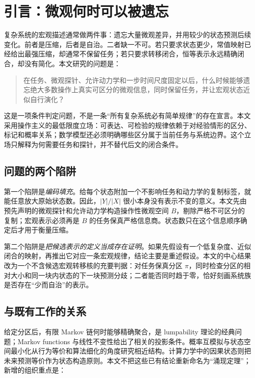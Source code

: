 \section{引言：微观何时可以被遗忘}
\label{sec:introduction}

复杂系统的宏观描述通常做两件事：遗忘大量微观差异，并用较少的状态预测后续变化。前者是压缩，后者是自治。二者缺一不可。若只要求状态更少，常值映射已经给出最强压缩，却通常不保留任务；若只要求转移闭合，恒等表示永远精确闭合，却没有简化。本文研究的问题是：

\begin{quote}
在任务、微观探针、允许动力学和一步时间尺度固定以后，什么时候能够遗忘绝大多数操作上真实可区分的微观信息，同时保留任务，并让宏观状态近似自行演化？
\end{quote}

这是一项条件判定问题，不是一条“所有复杂系统必有简单规律”的存在宣言。本文采用操作主义的最低限度立场：可表达、可检验的规律依赖于对经验情形的区分、标记和概率关系；数学模型还必须明确哪些区分属于当前任务与系统边界。这个立场只解释为何需要任务和探针，并不替代后文的闭合条件。

\subsection{问题的两个陷阱}

第一个陷阱是\emph{编码填充}。给每个状态附加一个不影响任务和动力学的复制标签，就能任意放大原始状态数。因此，$|Y|/|X|$ 很小本身没有表示不变的意义。本文先由预先声明的微观探针和允许动力学构造操作性微观空间 $B$，剔除严格不可区分的复制；宏观表示必须再是 $B$ 的任务保真严格信息商。状态数只在这个信息顺序确定后才用于衡量压缩。

第二个陷阱是\emph{把候选表示的定义当成存在证明}。如果先假设有一个低复杂度、近似闭合的映射，再推出它对应一条宏观规律，结论主要是重述假设。本文的中心结果改为一个不含候选宏观转移核的充要判据：对任务保真分区 $\pi$，同时检查分区的相对大小和同一块内状态的下一块预测分歧；二者能否同时趋于零，恰好刻画系统族是否存在“少而自治”的表示。

\subsection{与既有工作的关系}

给定分区后，有限 Markov 链何时能够精确聚合，是 lumpability 理论的经典问题\citep{KemenySnell1976,Buchholz1994}；Markov functions 与线性不变性给出了相关的投影条件\citep{RogersPitman1981,GurvitsLedoux2005}。概率互模拟与状态空间最小化从行为等价和算法细化的角度研究相近结构\citep{LarsenSkou1991,DerisaviEtAl2003}。计算力学中的因果状态则把未来预测等价作为状态构造原则\citep{CrutchfieldYoung1989,ShaliziCrutchfield2001}。本文不把这些已有结论重新命名为“涌现定理”；新增的组织重点是：

